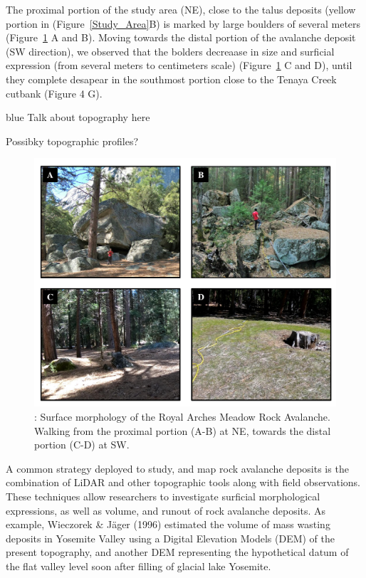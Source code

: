 \documentclass[5p]{elsarticle}
\newcommand{\COMON}{\begin{color}{blue}}
\newcommand{\COMOFF}{\end{color}}
\begin{document}
The proximal portion of the study area (NE), close to the talus deposits (yellow portion in (Figure~\ref{Study_Area}B) is marked by large boulders of several meters (Figure~\ref{Study_Area2} A and B). Moving towards the distal portion of the avalanche deposit (SW direction), we observed that the bolders decreaase in size and surficial expression (from several meters to centimeters scale) (Figure~\ref{Study_Area2} C and D), until they complete desapear in the southmost portion close to the Tenaya Creek cutbank (Figure 4 G).

\COMON
	Talk about topography here
	
	Possibky topographic profiles?
\COMOFF

									\begin{figure}[h]

	\includegraphics[width=\textwidth]{Figures/Study_Area2.pdf}
		\caption{: Surface morphology of the Royal Arches Meadow Rock Avalanche. Walking from the proximal portion (A-B) at NE, towards the distal portion (C-D) at SW. \label{Study_Area2}}

									\end{figure}
			
A common strategy deployed to study, and map rock avalanche deposits is the combination of LiDAR and other topographic tools along with field observations. These techniques allow researchers to investigate surficial morphological expressions, as well as volume, and runout of rock avalanche deposits. As example, Wieczorek \& J\"ager (1996) estimated the volume of mass wasting deposits in Yosemite Valley using  a Digital Elevation Models (DEM) of the present topography, and  another DEM representing the hypothetical datum of the flat valley level soon after filling of glacial lake Yosemite. 
\end{document}
